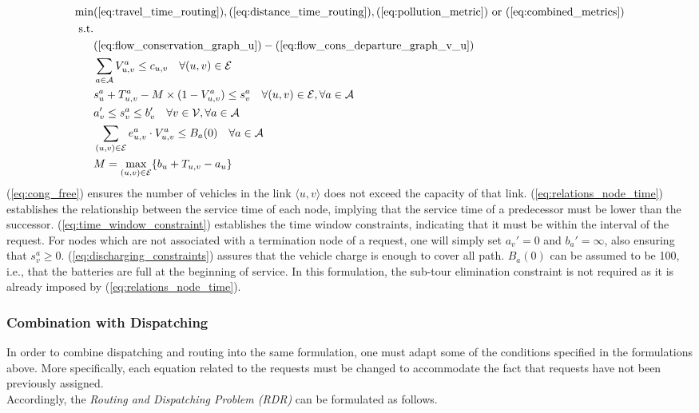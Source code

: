\begin{align}
	\text{min}&  
		(\ref{eq:travel_time_routing}), (\ref{eq:distance_time_routing}), (\ref{eq:pollution_metric}) \text{ or } (\ref{eq:combined_metrics})
	\nonumber\\
	\text{s.t.} &\nonumber\\
	&(\ref{eq:flow_conservation_graph_u})-(\ref{eq:flow_cons_departure_graph_v_u})\nonumber\\
	&\sum_{a \in \mathcal{A}}V^a_{u,v} \leq c_{u,v} \quad \forall (u,v) \in \mathcal{E} \label{eq:cong_free}\\
	&s_{u}^a + T_{u,v}^a - M\times(1-V^a_{u,v}) \leq s_{v}^a  \quad \forall (u,v) \in \mathcal{E}, \forall a \in \mathcal{A}\label{eq:relations_node_time}\\
	&a'_v \leq s_{v}^a \leq b'_v \quad \forall v \in \mathcal{V}, \forall a \in \mathcal{A}\label{eq:time_window_constraint}\\
	&\sum_{(u,v) \in \mathcal{E}}e^a_{u,v}\cdot V^a_{u,v} \leq B_a(0)\quad \forall a \in \mathcal{A} \label{eq:discharging_constraints}\\
	&M= \underset{(u,v) \in \mathcal{E}}{\text{max}}\{b_u + T_{u,v}-a_u\}\nonumber
\end{align} 
(\ref{eq:cong_free}) ensures the number of vehicles in the link $\langle u,v\rangle$ does not exceed the capacity of that link. (\ref{eq:relations_node_time}) establishes the relationship between the service time of each node, implying that the service time of a predecessor must be lower than the successor. (\ref{eq:time_window_constraint}) establishes the time window constraints, indicating that it must be within the interval of the request. For nodes which are not associated with a termination node of a request, one will simply set $a_v' = 0 $ and $b_a' = \infty$, also ensuring that $s_v^a \ge 0 $. (\ref{eq:discharging_constraints}) assures that the vehicle charge is enough to cover all path. $B_a(0)$ can be assumed to be 100, i.e., that the batteries are full at the beginning of service. In this formulation, the sub-tour elimination constraint is not required as it is already imposed by (\ref{eq:relations_node_time}). 
\subsubsection*{Combination with Dispatching}
In order to combine dispatching and routing into the same formulation, one must adapt some of the conditions specified in the formulations above. More specifically, each equation related to the requests must be changed to accommodate the fact that requests have not been previously assigned. \\
Accordingly, the \textit{Routing and Dispatching Problem (RDR)} can be formulated as follows. 

